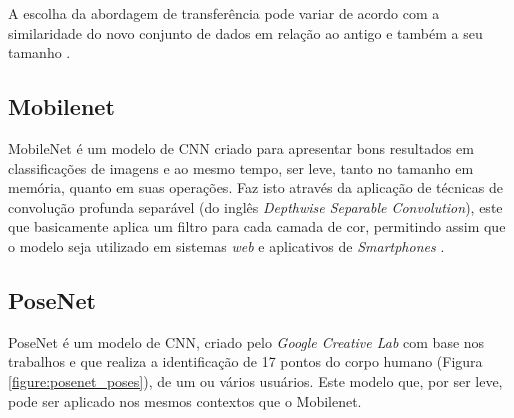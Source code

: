 \par A escolha da abordagem de transferência pode variar de acordo com a similaridade do novo conjunto de dados em relação ao antigo e também a seu tamanho \cite{Carneiro2017}.


\subsection{Mobilenet}

\par MobileNet é um modelo de CNN criado para apresentar bons resultados em classificações de imagens e ao mesmo tempo, ser leve, tanto no tamanho em memória, quanto em suas operações. Faz isto através da aplicação de técnicas de convolução profunda separável (do inglês \textit{Depthwise Separable Convolution}), este que basicamente aplica um filtro para cada camada de cor, permitindo assim que o modelo seja utilizado em sistemas \textit{web} e aplicativos de \textit{Smartphones} \cite{howard2017mobilenets}.

\subsection{PoseNet}

\par PoseNet é um modelo de CNN, criado pelo \textit{Google Creative Lab} com base nos trabalhos \cite{george2017} e \cite{george2018} que realiza a identificação de 17 pontos do corpo humano (Figura \ref{figure:posenet_poses}), de um ou vários usuários. Este modelo que, por ser leve, pode ser aplicado nos mesmos contextos que o Mobilenet.


